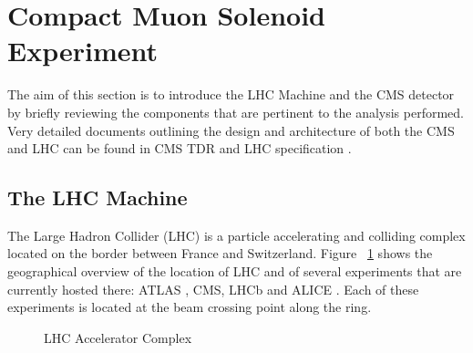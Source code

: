 \section{Compact Muon Solenoid Experiment} \label{section:higgs_cms}
The aim of this section is to introduce the LHC Machine and the CMS detector by  briefly reviewing the components that are pertinent to the analysis performed. Very detailed documents outlining the design and architecture of both the CMS and LHC can be found in CMS TDR \cite{TDR,CMSExperiment} and LHC specification \cite{lhcMachine}.

\subsection{The LHC Machine} \label{subsection:higgs_cms_lhc}
The Large Hadron Collider (LHC) is a particle accelerating and colliding complex located on the border between France and Switzerland. Figure ~\ref{fig:higgs_cms_lhc} shows the geographical overview of the location of LHC and of several experiments that are currently hosted there: ATLAS \cite{ATLASExperiment}, CMS, LHCb \cite{LHCbExperiment} and ALICE \cite{ALICEExperiment}. Each of these experiments is located at the beam crossing point along the ring.
\begin{figure}[hbp]
    \centering
    \caption{LHC Accelerator Complex}
    \label{fig:higgs_cms_lhc}
 \end{figure}

